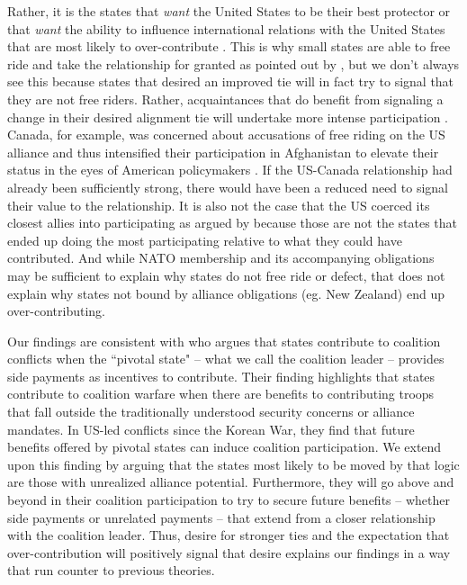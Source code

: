 \documentclass[12pt,letterpaper]{article}
\begin{document}
	Rather, it is the states that \textit{want} the United States to be their best protector or that \textit{want} the ability to influence international relations with the United States that are most likely to over-contribute \citep{vonhlatky_greatasymmetryamerica_2010}. This is why small states are able to free ride and take the relationship for granted as pointed out by \citet{keohane_biginfluencesmall_1971}, but we don't always see this because states that desired an improved tie will in fact try to signal that they are not free riders. Rather, acquaintances that do benefit from signaling a change in their desired alignment tie will undertake more intense participation \citep{gibler_priorcommitmentscompatible_2004, gartzke_contractsfriendsalliances_2012}. Canada, for example, was concerned about accusations of free riding on the US alliance and thus intensified their participation in Afghanistan to elevate their status in the eyes of American policymakers \citep{massie_alliancevaluestatus_2018}. If the US-Canada relationship had already been sufficiently strong, there would have been a reduced need to signal their value to the relationship. It is also not the case that the US coerced its closest allies into participating as argued by \citet{kupchan_natopersiangulf_1988} because those are not the states that ended up doing the most participating relative to what they could have contributed. And while NATO membership and its accompanying obligations may be sufficient to explain why states do not free ride or defect, that does not explain why states not bound by alliance obligations (eg. New Zealand) end up over-contributing.
 			
	Our findings are consistent with \citet{henke_buyingalliespayment_2019} who argues that states contribute to coalition conflicts when the ``pivotal state" -- what we call the coalition leader -- provides side payments as incentives to contribute. Their finding highlights that states contribute to coalition warfare when there are benefits to contributing troops that fall outside the traditionally understood security concerns or alliance mandates. In US-led conflicts since the Korean War, they find that future benefits offered by pivotal states can induce coalition participation. We extend upon this finding by arguing that the states most likely to be moved by that logic are those with unrealized alliance potential. Furthermore, they will go above and beyond in their coalition participation to try to secure future benefits -- whether side payments or unrelated payments -- that extend from a closer relationship with the coalition leader. Thus, desire for stronger ties and the expectation that over-contribution will positively signal that desire explains our findings in a way that run counter to previous theories.
\end{document}
